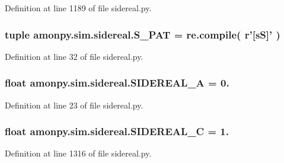 Definition at line 1189 of file sidereal.\-py.

\hypertarget{namespaceamonpy_1_1sim_1_1sidereal_a4b605d3e49744d64f74f57576d40f0de}{
\subsubsection[{S\-\_\-\-P\-A\-T}]{\setlength{\rightskip}{0pt plus 5cm}tuple amonpy.\-sim.\-sidereal.\-S\-\_\-\-P\-A\-T = re.\-compile( r'\mbox{[}s\-S\mbox{]}' )}}\label{namespaceamonpy_1_1sim_1_1sidereal_a4b605d3e49744d64f74f57576d40f0de}


Definition at line 32 of file sidereal.\-py.

\hypertarget{namespaceamonpy_1_1sim_1_1sidereal_a6ad7734e7b76fc336711a9a500bc8032}{
\subsubsection[{S\-I\-D\-E\-R\-E\-A\-L\-\_\-\-A}]{\setlength{\rightskip}{0pt plus 5cm}float amonpy.\-sim.\-sidereal.\-S\-I\-D\-E\-R\-E\-A\-L\-\_\-\-A = 0.}}\label{namespaceamonpy_1_1sim_1_1sidereal_a6ad7734e7b76fc336711a9a500bc8032}


Definition at line 23 of file sidereal.\-py.

\hypertarget{namespaceamonpy_1_1sim_1_1sidereal_a07bd4ddef1a220bfe344b9dda000fe0d}{
\subsubsection[{S\-I\-D\-E\-R\-E\-A\-L\-\_\-\-C}]{\setlength{\rightskip}{0pt plus 5cm}float amonpy.\-sim.\-sidereal.\-S\-I\-D\-E\-R\-E\-A\-L\-\_\-\-C = 1.}}\label{namespaceamonpy_1_1sim_1_1sidereal_a07bd4ddef1a220bfe344b9dda000fe0d}


Definition at line 1316 of file sidereal.\-py.

